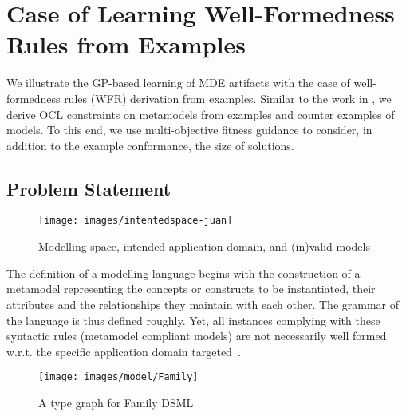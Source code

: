 
\section{Case of Learning Well-Formedness Rules from Examples}\label{sec:approach}
We illustrate the GP-based learning of MDE artifacts with the case of well-formedness rules (WFR) derivation from examples. Similar to the work in \cite{faunes2013}, we derive OCL constraints on metamodels from examples and counter examples of models. To this end, we use multi-objective fitness guidance to consider, in addition to the example conformance, the size of solutions.

\subsection{Problem Statement}
\begin{figure}[b]
	\centering
	\texttt{[image: images/intentedspace-juan]}
	\caption{Modelling space, intended application domain, and (in)valid models}
	\label{fig:intentedspace}
\end{figure}



The definition of a modelling language begins with the construction of a metamodel representing the concepts or constructs to be instantiated, their attributes and the relationships they maintain with each other. The grammar of the language is thus defined roughly. Yet, all instances complying with these syntactic rules (metamodel compliant models) are not necessarily well formed w.r.t. the specific application domain targeted~\citep{cadavid2012}.


\begin{figure}[h]
	\centering
	\texttt{[image: images/model/Family]}
	\caption{A type graph for Family DSML}
	\label{fig:typegraph}
\end{figure}

